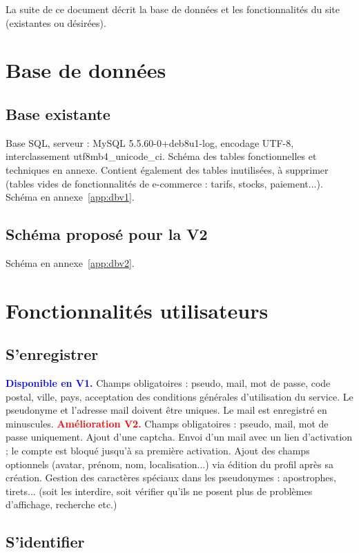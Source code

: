 ﻿\documentclass[a4paper,10pt]{article}
\newcommand\existant[1]{\noindent\textbf{\textcolor{blue}{#1}}}
\newcommand\desire[1]{\noindent\textbf{\textcolor{red}{#1}}}
\begin{document}
La suite de ce document décrit la base de données et les fonctionnalités du site (existantes ou désirées).


\section{Base de données}
\subsection{Base existante}
Base SQL, serveur : MySQL 5.5.60-0+deb8u1-log, encodage UTF-8, interclassement utf8mb4\_unicode\_ci. Schéma des tables fonctionnelles et techniques en annexe. Contient également des tables inutilisées, à supprimer (tables vides de fonctionnalités de e-commerce : tarifs, stocks, paiement...). Schéma en annexe~\ref{app:dbv1}.

\subsection{Schéma proposé pour la V2}

Schéma en annexe~\ref{app:dbv2}.

\section{Fonctionnalités utilisateurs}
\subsection{S'enregistrer}

\existant{Disponible en V1.} Champs obligatoires : pseudo, mail, mot de passe, code postal, ville, pays, acceptation des conditions générales d'utilisation du service. Le pseudonyme et l'adresse mail doivent être uniques. Le mail est enregistré en minuscules. 
\desire{Amélioration V2.} Champs obligatoires : pseudo, mail, mot de passe uniquement. Ajout d'une captcha. Envoi d'un mail avec un lien d'activation ; le compte est bloqué jusqu'à sa première activation. Ajout des champs optionnels (avatar, prénom, nom, localisation...) via édition du profil après sa création. Gestion des caractères spéciaux dans les pseudonymes : apostrophes, tirets... (soit les interdire, soit vérifier qu'ils ne posent plus de problèmes d'affichage, recherche etc.) 

\subsection{S'identifier}
\end{document}
